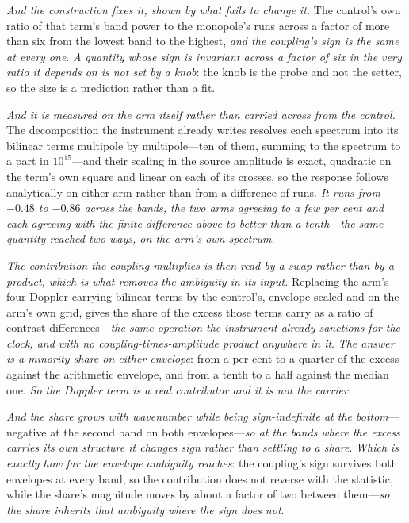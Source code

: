 \documentclass[11pt,a4paper]{article}
\theoremstyle{plain}
\theoremstyle{definition}
\theoremstyle{remark}
\begin{document}
\emph{And the construction fixes it, shown by what fails to change it.} The control's own ratio of that
term's band power to the monopole's runs across a factor of more than six from the lowest band to the
highest, \emph{and the coupling's sign is the same at every one}. \emph{A quantity whose sign is invariant
across a factor of six in the very ratio it depends on is not set by a knob}: the knob is the probe and not
the setter, so the size is a prediction rather than a fit.

\emph{And it is measured on the arm itself rather than carried across from the control.} The decomposition the
instrument already writes resolves each spectrum into its bilinear terms multipole by multipole---ten of them,
summing to the spectrum to a part in $10^{15}$---and their scaling in the source amplitude is exact, quadratic
on the term's own square and linear on each of its crosses, so the response follows analytically on either arm
rather than from a difference of runs. \emph{It runs from $-0.48$ to $-0.86$ across the bands, the two arms
agreeing to a few per cent and each agreeing with the finite difference above to better than a
tenth}---\emph{the same quantity reached two ways, on the arm's own spectrum}.

\emph{The contribution the coupling multiplies is then read by a swap rather than by a product, which is what
removes the ambiguity in its input.} Replacing the arm's four Doppler-carrying bilinear terms by the
control's, envelope-scaled and on the arm's own grid, gives the share of the excess those terms carry as a
ratio of contrast differences---\emph{the same operation the instrument already sanctions for the clock, and
with no coupling-times-amplitude product anywhere in it}. \emph{The answer is a minority share on either
envelope}: from a per cent to a quarter of the excess against the arithmetic envelope, and from a tenth to a
half against the median one. \emph{So the Doppler term is a real contributor and it is not the carrier.}

\emph{And the share grows with wavenumber while being sign-indefinite at the bottom}---negative at the second
band on both envelopes---\emph{so at the bands where the excess carries its own structure it changes sign
rather than settling to a share}. \emph{Which is exactly how far the envelope ambiguity reaches}: the coupling's sign survives both
envelopes at every band, so the contribution does not reverse with the statistic, while the share's magnitude
moves by about a factor of two between them---\emph{so the share inherits that ambiguity where the sign does
not}.
\end{document}
